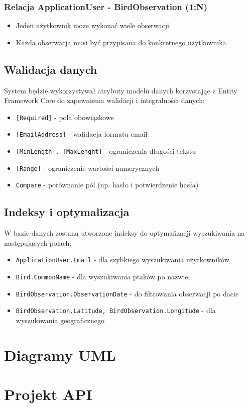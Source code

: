 \subsubsection{Relacja ApplicationUser - BirdObservation (1:N)}
\begin{itemize}
	\item Jeden użytkownik może wykonać wiele obserwacji
	\item Każda obserwacja musi być przypisana do konkretnego użytkownika
\end{itemize}

\subsection{Walidacja danych}
System będzie wykorzystywał atrybuty modelu danych korzystając z Entity Framework Core do zapewnienia walidacji i integralności danych:
\begin{itemize}
	\item \texttt{[Required]} - pola obowiązkowe
	\item \texttt{[EmailAddress]} - walidacja formatu email
	\item \texttt{[MinLength], [MaxLenght]} - ograniczenia długości tekstu
	\item \texttt{[Range]} - ograniczenie wartości numerycznych
	\item \texttt{Compare} - porównanie pól (np. hasło i potwierdzenie hasła)
\end{itemize}

\subsection{Indeksy i optymalizacja}
W bazie danych zostaną utworzone indeksy do optymalizacji wyszukiwania na następujących polach:
\begin{itemize}
	\item \texttt{ApplicationUser.Email} - dla szybkiego wyszukiwania użytkowników
	\item \texttt{Bird.CommonName} - dla wyszukiwania ptaków po nazwie
	\item \texttt{BirdObservation.ObservationDate} - do filtrowania obserwacji po dacie
	\item \texttt{BirdObservation.Latitude, BirdObservation.Longitude} - dla wyszukiwania geograficznego
\end{itemize}

\section{Diagramy UML}


\section{Projekt API}
